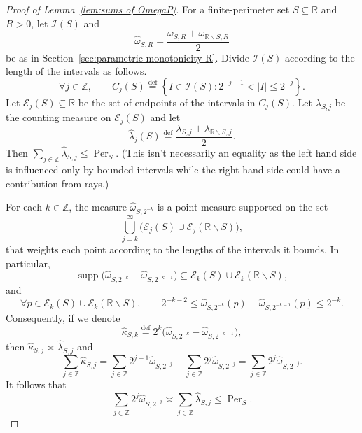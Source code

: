 \documentclass[11pt,reqno]{amsart}
\newcommand{\R}{\mathbb{R}}
\newcommand{\Z}{\mathbb{Z}}
\newcommand{\cE}{\mathcal{E}}
\newcommand{\cI}{\mathcal{I}}
\newcommand{\cL}{\mathcal{L}}
\newcommand{\cN}{\mathcal{N}}
\renewcommand{\approx}{\asymp}
\newcommand{\ud}[0]{\,\mathrm{d}}
\newcommand{\0}{\mathbf{0}}
\renewcommand{\1}{\mathbf 1}
\newcommand{\from}{\colon}
\renewcommand{\mid}{:}
\renewcommand{\subset}{\subseteq}
\newcommand{\eqdef}{\stackrel{\mathrm{def}}{=}}
\renewcommand{\ge}{\geqslant}
\renewcommand{\le}{\leqslant}
\renewcommand{\setminus}{\smallsetminus}
\newtheorem{lemma}[thm]{Lemma}
\theoremstyle{remark}
\DeclareMathOperator{\supp}{supp}
\DeclareMathOperator{\Per}{Per}
\begin{document}

\begin{proof}[{Proof of Lemma~\ref{lem:sums of OmegaP}}]
  For a finite-perimeter set $S\subset \R$ and $R>0$, let $\cI(S)$ and $$\widehat{\omega}_{S, R}=\frac{\omega_{S,R}+\omega_{\R\setminus S,R}}{2}$$ be as in Section~\ref{sec:parametric monotonicity R}.  Divide $\cI(S)$ according to the length of the intervals as follows.
  $$\forall j\in \Z,\qquad C_j(S)\eqdef\left\{I\in \cI(S)\mid 2^{-j-1}< |I| \le 2^{-j}\right\}.$$
  Let $\cE_j(S)\subset \R$ be the set of endpoints of the intervals in $C_j(S)$.  Let $\lambda_{S,j}$ be the counting measure on $\cE_j(S)$ and let $$\widehat{\lambda}_j(S)\eqdef \frac{\lambda_{S,j}+\lambda_{\R\setminus S,j}}{2}.$$  Then $\sum_{j\in \Z}\widehat{\lambda}_{S,j}\le \Per_{S}$.  (This isn't necessarily an equality as the left hand side is influenced only by bounded intervals while the right hand side could have a contribution from rays.)

  For each $k\in \Z$, the measure $\widehat{\omega}_{S, 2^{-k}}$ is a point measure supported on the set
  $$\bigcup_{j=k}^\infty \big(\cE_j(S) \cup \cE_j(\R\setminus S)\big),
   $$
   that weights each point according to the lengths of the intervals it bounds.  In particular, $$\supp\big(\widehat{\omega}_{S,2^{-k}}-\widehat{\omega}_{S,2^{-k-1}}\big)\subset \cE_k(S)\cup \cE_k(\R\setminus S),
    $$
    and
    $$\forall p\in \cE_k(S)\cup \cE_k(\R\setminus S),\qquad 2^{-k-2}\le \widehat{\omega}_{S,2^{-k}}(p) - \widehat{\omega}_{S,2^{-k-1}}(p)\le 2^{-k}.$$
    Consequently, if we denote
  $$\widehat{\kappa}_{S,k} \eqdef 2^{k}\big(\widehat{\omega}_{S,2^{-k}} - \widehat{\omega}_{S,2^{-k-1}}\big),$$
  then $\widehat{\kappa}_{S,j}\approx \widehat{\lambda}_{S,j}$ and
  $$
  \sum_{j\in \Z} \widehat{\kappa}_{S,j}=\sum_{j\in \Z} 2^{j+1} \widehat{\omega}_{S,2^{-j}} - \sum_{j\in \Z} 2^{j} \widehat{\omega}_{S,2^{-j}}=   \sum_{j\in \Z} 2^j \widehat{\omega}_{S,2^{-j}}.
  $$
It follows that
  \begin{equation}\label{eq:less than per}\sum_{j\in \Z} 2^j \widehat{\omega}_{S,2^{-j}} \approx \sum_{j\in \Z} \widehat{\lambda}_{S,j}\le \Per_{S}.
  \end{equation}


\end{proof}
\end{document}
